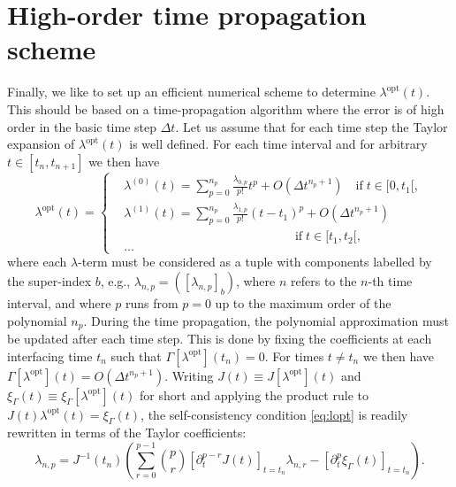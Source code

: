 \documentclass[twocolumn,prb,showpacs,aps,superscriptaddress]{revtex4}
\begin{document}
\section{High-order time propagation scheme}
\label{sec:high-order}

Finally, we like to set up an efficient numerical scheme to determine
$\lambda^\text{opt}(t)$.  This should be based on a time-propagation algorithm
where the error is of high order in the basic time step $\Delta t$.  Let us
assume that for each time step the Taylor expansion of $\lambda^\text{opt}(t)$
is well defined.  For each time interval and for arbitrary $t \in [t_{n},
t_{n+1}]$ we then have
\begin{equation}
  \lambda^\text{opt}(t) 
  =
  \left\{
    \begin{aligned}
      &\lambda^{(0)}(t) 
      = 
      \sum_{p = 0}^{n_p} \frac{\lambda_{0,p}}{p!} t^p + O(\Delta t^{n_p + 1})
      \quad\text{if} \;  t\in[0, t_1[,\\
          &\lambda^{(1)}(t) 
      = 
      \sum_{p = 0}^{n_p} \frac{\lambda_{1,p}}{p!} 
      (t - t_1)^p + O(\Delta t^{n_p + 1})\\
      &\,\,\,\,\,\quad\qquad\qquad\qquad\qquad\qquad\qquad
       \text{if} \; t\in[t_1, t_2[,\\
      &\dots
    \end{aligned}
  \right.
\end{equation}
where each $\lambda$-term must be considered as a tuple with components
labelled by the super-index $b$, e.g., $\lambda_{n,p} = ([\lambda_{n,p}]_b)$,
where $n$ refers to the $n$-th time interval, and where $p$ runs from $p=0$ up
to the maximum order of the polynomial $n_p$.  During the time propagation, the
polynomial approximation must be updated after each time step.  This is done by
fixing the coefficients at each interfacing time $t_n$ such that
$\Gamma[\lambda^\text{opt}](t_n) = 0$. For times $t \neq t_n$ we then have
$\Gamma[\lambda^\text{opt}](t) = O(\Delta t^{n_p + 1})$.  Writing $J(t) \equiv
J[\lambda^\text{opt}](t)$ and $\xi_\Gamma(t)\equiv
\xi_\Gamma[\lambda^\text{opt}](t)$ for short and applying the product rule to
$J(t) \lambda^\text{opt}(t) = \xi_\Gamma(t)$, the self-consistency condition
\eqref{eq:lopt} is readily rewritten in terms of the Taylor coefficients:
\begin{equation}
  \label{eq:lHn}
  \lambda_{n,p} 
  = 
  J^{-1}(t_n)
  \left(
    \sum_{r=0}^{p-1} \binom{p}{r} [\partial_t^{p-r} J(t)]_{t=t_n} 
    \lambda_{n,r}
    - 
    [\partial_t^p \xi_{\Gamma}(t)]_{t =t_n}
  \right).
\end{equation}
\end{document}
